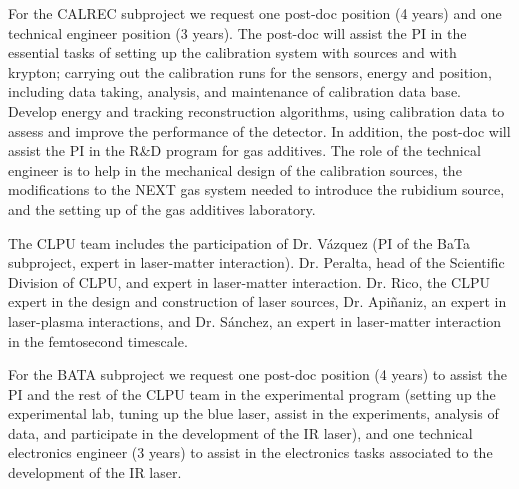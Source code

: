 For the CALREC subproject we request one post-doc position (4 years) and one technical engineer position (3 years). The post-doc will assist the PI in the essential tasks of setting up the calibration system with sources and with krypton; carrying out the calibration runs for the sensors, energy and position, including data taking, analysis, and maintenance of calibration data base. Develop energy and tracking reconstruction algorithms, using calibration data to assess and improve the performance of the detector. In addition, the post-doc will assist the PI in the R\&D program for gas additives. The role of the technical engineer is to help in the mechanical design of the calibration sources, the modifications to the NEXT gas system needed to introduce the rubidium source, and the setting up of the gas additives laboratory. 

The CLPU team includes the participation of Dr. V\'azquez  (PI of the BaTa subproject,  expert in laser-matter interaction). Dr. Peralta, head of the Scientific Division of CLPU, and expert in laser-matter interaction. Dr. Rico, the CLPU expert in the
design and construction of laser sources, Dr. Api\~naniz, an expert in laser-plasma interactions, and Dr. S\'anchez, an expert in laser-matter interaction in the femtosecond
timescale.

For the BATA subproject we request one post-doc position (4 years) to assist the PI and the rest of the CLPU team in the experimental program (setting up the experimental lab, tuning up the blue laser, assist in the experiments, analysis of data, and participate in the development of the IR laser), and one technical electronics engineer (3 years) to assist in the electronics tasks associated to the development of the IR laser.  

